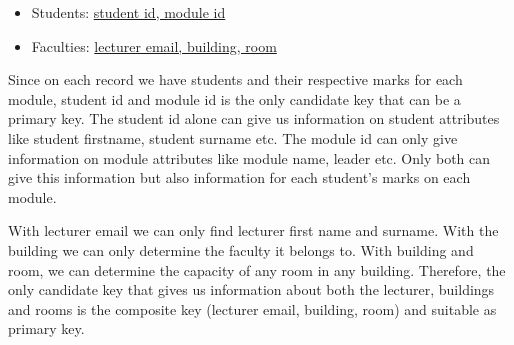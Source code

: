 \begin{itemize}
    \item Students: \underline{student id, module id}
    \item Faculties: \underline{lecturer email, building, room}
\end{itemize}

Since on each record we have students and their respective marks for each module, student id and module id is the only candidate key that can be a primary key. The student id alone can give us information on student attributes like student firstname, student surname etc. The module id can only give information on module attributes like module name, leader etc. Only both can give this information but also information for each student’s marks on each module.

With lecturer email we can only find lecturer first name and surname. With the building we can only determine the faculty it belongs to. With building and room, we can determine the capacity of any room in any building. Therefore, the only candidate key that gives us information about both the lecturer, buildings and rooms is the composite key (lecturer email, building, room) and suitable as primary key.